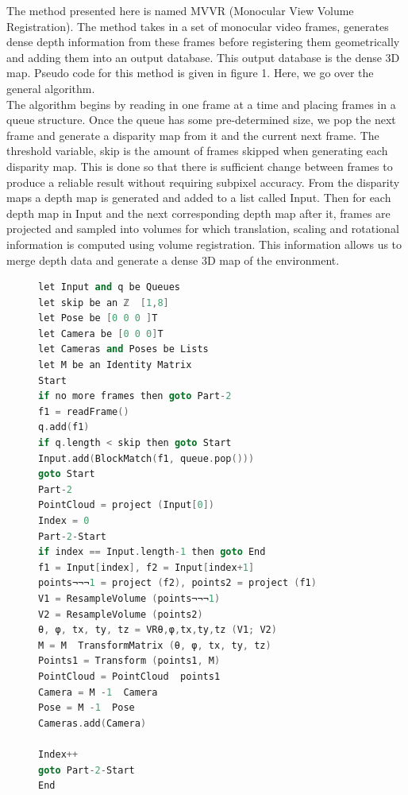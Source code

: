 The method presented here is named MVVR (Monocular View Volume Registration). The method takes in a set of monocular video frames, generates dense depth information from these frames before registering them geometrically and adding them into an output database. This output database is the dense 3D map. Pseudo code for this method is given in figure 1. Here, we go over the general algorithm. \\

The algorithm begins by reading in one frame at a time and placing frames in a queue structure. Once the queue has some pre-determined size, we pop the next frame and generate a disparity map from it and the current next frame. The threshold variable, skip is the amount of frames skipped when generating each disparity map. This is done so that there is sufficient change between frames to produce a reliable result without requiring subpixel accuracy. From the disparity maps a depth map is generated and added to a list called Input. Then for each depth map in Input and the next corresponding depth map after it, frames are projected and sampled into volumes for which translation, scaling and rotational information is computed using volume registration. This information allows us to merge depth data and generate a dense 3D map of the environment. \\

\begin{figure}
\begin{lstlisting}[language=c++,caption=Monocular View Volume Reconstruction,label=algorithm:MVVRAlgorithm,mathescape,basicstyle=\ttfamily]
let Input and q be Queues
let skip be an ℤ  [1,8]
let Pose be [0 0 0 ]T
let Camera be [0 0 0]T
let Cameras and Poses be Lists
let M be an Identity Matrix
Start
if no more frames then goto Part-2
f1 = readFrame()
q.add(f1)
if q.length < skip then goto Start
Input.add(BlockMatch(f1, queue.pop()))
goto Start
Part-2
PointCloud = project (Input[0])
Index = 0
Part-2-Start
if index == Input.length-1 then goto End
f1 = Input[index], f2 = Input[index+1]
points¬¬¬1 = project (f2), points2 = project (f1)
V1 = ResampleVolume (points¬¬¬1)
V2 = ResampleVolume (points2)
θ, φ, tx, ty, tz = VRθ,φ,tx,ty,tz (V1; V2)
M = M  TransformMatrix (θ, φ, tx, ty, tz)
Points1 = Transform (points1, M)
PointCloud = PointCloud  points1
Camera = M -1  Camera
Pose = M -1  Pose
Cameras.add(Camera)
 
Index++
goto Part-2-Start
End
\end{lstlisting}
\end{figure}

